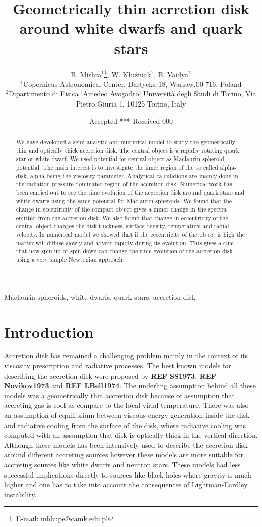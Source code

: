 \documentclass[useAMS,usenatbib]{mn2e}
\title[Geometrically thin acrretion disk around white dwarfs and quark stars]{Geometrically thin acrretion disk around white dwarfs and quark stars}
\author[B. Mishra, W. Klu\'zniak and B. Vaidya]{B. Mishra$^{1}$\thanks{E-mail:
mbhupe@camk.edu.pl}, W. Klu\'zniak$^{1}$, B. Vaidya$^{2}$\\
$^{1}$Copernicus Astronomical Center, Bartycka 18, Warsaw,00-716, Poland\\
$^{2}$Dipartimento di Fisica `Amedeo Avogadro' Università degli Studi di Torino, Via Pietro Giuria 1, 10125 Torino, Italy}
\newcommand{\mref}[1]{\textbf{REF #1}}
\begin{document}
\date{Accepted *** Received 000}
\pagerange{\pageref{firstpage}--\pageref{lastpage}} 
\maketitle
\label{firstpage}
\begin{abstract}
We have developed a semi-analytic and numerical model to study the geometrically thin and optically thick accretion disk. The central object is a rapidly rotating quark star or white dwarf. We used potential for central object as Maclaurin spheroid potential. The main interest is to investigate the inner region of the so called alpha-disk, alpha being the viscosity parameter. Analytical calculations are mainly done in the radiation pressure dominated region of the accretion disk. Numerical work has been carried out to see the time evolution of the accretion disk around quark stars and white dwarfs using the same potential for Maclaurin spheroids. We found that the change in eccentricity of the compact object gives a minor change in the spectra emitted from the accretion disk. We also found that change in eccentricity of the central object changes the disk thickness, surface density, temperature and radial velocity. In numerical model we showed that if the eccentricity of the object is high the matter will diffuse slowly and advect rapidly during its evolution. This gives a clue that how spin-up or spin-down can change the time evolution of the accretion disk using a very simple Newtonian approach.  
\end{abstract}
\begin{keywords}
Maclaurin spheroids, white dwarfs, quark stars, accretion disk
\end{keywords}
\section{Introduction}
Accretion disk has remained a challenging problem mainly in the context of its viscosity prescription and radiative processes. The best known models for describing the accretion disk were proposed by \mref{SS1973}, \mref{Novikov1973} and \mref{LBell1974}. The underling assumption behind all these models was a geometrically thin accretion disk because of assumption that accreting gas is cool as compare to the local virial temperature. There was also an assumption of equilibrium between viscous energy generation inside the disk and radiative cooling from the surface of the disk, where radiative cooling was computed with an assumption that disk is optically thick in the vertical direction. Although these models has been intensively used to describe the accretion disk around different accreting sources however these models are more suitable for accreting sources like white dwarfs and neutron stars. These models had less successful implications directly to sources like black holes where gravity is much higher and one has to take into account the consequences of Lightman-Eardley instability. 
\end{document}
